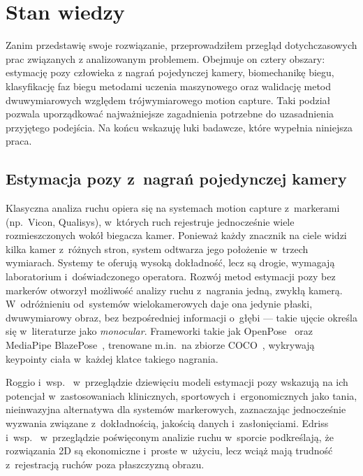 \chapter{Stan wiedzy}
\label{ch:sota}

Zanim przedstawię swoje rozwiązanie, przeprowadziłem przegląd dotychczasowych prac związanych z analizowanym problemem. Obejmuje on cztery obszary: estymację pozy człowieka z nagrań pojedynczej kamery, biomechanikę biegu, klasyfikację faz biegu metodami uczenia maszynowego oraz walidację metod dwuwymiarowych względem trójwymiarowego motion capture. Taki podział pozwala uporządkować najważniejsze zagadnienia potrzebne do uzasadnienia przyjętego podejścia. Na końcu wskazuję luki badawcze, które wypełnia niniejsza praca.


\section{Estymacja pozy z~nagrań pojedynczej kamery}
\label{sec:sota-pose}

Klasyczna analiza ruchu opiera się na systemach motion capture z~markerami (np.~Vicon, Qualisys), w~których ruch rejestruje jednocześnie wiele rozmieszczonych wokół biegacza kamer. Ponieważ każdy znacznik na ciele widzi kilka kamer z~różnych stron, system odtwarza jego położenie w~trzech wymiarach. Systemy te oferują wysoką dokładność, lecz są drogie, wymagają laboratorium i~doświadczonego operatora. Rozwój metod estymacji pozy bez markerów otworzył możliwość analizy ruchu z~nagrania jedną, zwykłą kamerą. W~odróżnieniu od~systemów wielokamerowych daje ona jedynie płaski, dwuwymiarowy obraz, bez bezpośredniej informacji o~głębi --- takie ujęcie określa się w~literaturze jako \textit{monocular}. Frameworki takie jak OpenPose~\cite{cao2021openpose} oraz MediaPipe BlazePose~\cite{bazarevsky2020blazepose}, trenowane m.in.\ na zbiorze COCO~\cite{lin2014coco}, wykrywają keypointy ciała w~każdej klatce takiego nagrania.

Roggio i~wsp.~\cite{roggio2024review} w~przeglądzie dziewięciu modeli estymacji pozy wskazują na ich potencjał w~zastosowaniach klinicznych, sportowych i~ergonomicznych jako tania, nieinwazyjna alternatywa dla systemów markerowych, zaznaczając jednocześnie wyzwania związane z~dokładnością, jakością danych i~zasłonięciami. Edriss i~wsp.~\cite{frontiers2025review} w~przeglądzie poświęconym analizie ruchu w~sporcie podkreślają, że rozwiązania 2D są ekonomiczne i~proste w~użyciu, lecz wciąż mają trudność z~rejestracją ruchów poza płaszczyzną obrazu. 

